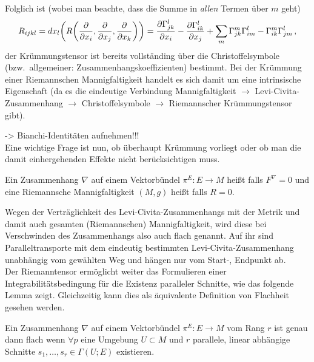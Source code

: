 Folglich ist (wobei man beachte, dass die Summe in \emph{allen} Termen über $m$ geht)
\begin{equation}
R_{ijkl} = dx_l\qty(R\qty(\pdv{x_i}, \pdv{x_j}, \pdv{x_k})) = \pdv{\Gamma_{jk}^l}{x_i} - \pdv{\Gamma_{ik}^l}{x_j} + \sum_m \Gamma_{jk}^m \Gamma_{im}^l - \Gamma_{ik}^m \Gamma_{jm}^l \, ,
\end{equation}
der Krümmungstensor ist bereits vollständing über die Christoffelsymbole (bzw.~allgemeiner: Zusammenhangskoeffizienten) bestimmt. Bei der Krümmung einer Riemannschen Mannigfaltigkeit handelt es sich damit um eine intrinsische Eigenschaft (da es die eindeutige Verbindung Mannigfaltigkeit $\rightarrow$ Levi-Civita-Zusammenhang $\rightarrow$ Christoffelsymbole $\rightarrow$ Riemannscher Krümmungstensor gibt).


-> Bianchi-Identitäten aufnehmen!!!\\


Eine wichtige Frage ist nun, ob überhaupt Krümmung vorliegt oder ob man die damit einhergehenden Effekte nicht berücksichtigen muss.

\begin{defi}[Flachheit]
Ein Zusammenhang $\nabla$ auf einem Vektorbündel $\pi^E: E \rightarrow M$ heißt  falls $F^\nabla = 0$ und eine Riemannsche Mannigfaltigkeit $(M, g)$ heißt  falls $R = 0$.
\end{defi}

Wegen der Verträglichkeit des Levi-Civita-Zusammenhangs mit der Metrik und damit auch gesamten (Riemannschen) Mannigfaltigkeit, wird diese bei Verschwinden des Zusammenhangs also auch flach genannt. Auf ihr sind Paralleltransporte mit dem eindeutig bestimmten Levi-Civita-Zusammenhang unabhängig vom gewählten Weg und hängen nur vom Start-, Endpunkt ab.\\





Der Riemanntensor ermöglicht weiter das Formulieren einer Integrabilitätsbedingung für die Existenz paralleler Schnitte, wie das folgende Lemma zeigt. Gleichzeitig kann dies als äquivalente Definition von Flachheit gesehen werden.
\begin{satz}[Flachheit V2]
Ein Zusammenhang $\nabla$ auf einem Vektorbündel $\pi^E: E \rightarrow M$ vom Rang $r$ ist genau dann flach wenn $\forall p$ eine Umgebung $U \subset M$ und $r$ parallele, linear abhängige Schnitte $s_1, \dots, s_r \in \Gamma(U; E)$ existieren.
\end{satz}

